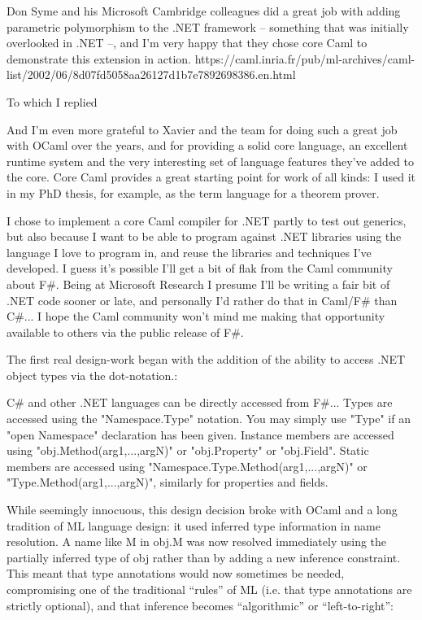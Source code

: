 \documentclass[acmsmall,screen]{acmart}
\begin{document}
\begin{verbquote}
Don Syme and his Microsoft Cambridge colleagues did a great job with adding parametric polymorphism to the .NET framework -- something that was initially overlooked in .NET --, and I'm very happy that they chose core Caml to demonstrate this extension in action. https://caml.inria.fr/pub/ml-archives/caml-list/2002/06/8d07fd5058aa26127d1b7e7892698386.en.html 
\end{verbquote}
To which I replied \citep{RefCamlArchive8}
\begin{verbquote}
And I'm even more grateful to Xavier and the team for doing such a great job with OCaml over the years, and for providing a solid core language, an excellent runtime system and the very interesting set of language features they've added to the core.  Core Caml provides a great starting point for work of all kinds: I used it in my PhD thesis, for example, as the term language for a theorem prover.

I chose to implement a core Caml compiler for .NET partly to test out generics, but also because I want to be able to program against .NET libraries using the language I love to program in, and reuse the libraries and techniques I've developed.  I guess it's possible I'll get a bit of flak from the Caml community about F#.  Being at Microsoft Research I presume I'll be writing a fair bit of .NET code sooner or late, and personally I'd rather do that in Caml/F# than C#... I hope the Caml community won't mind me making that opportunity available to others via the public release of F#.  
\end{verbquote}
The first real design-work began with the addition of the ability to access .NET object types via the dot-notation.:
\begin{verbquote}
C# and other .NET languages can be directly accessed from F#...  Types are accessed using the "Namespace.Type" notation.  You may simply use "Type" if an "open Namespace" declaration has been given. Instance members are accessed using "obj.Method(arg1,...,argN)" or "obj.Property" or "obj.Field". Static members are accessed using "Namespace.Type.Method(arg1,...,argN)" or "Type.Method(arg1,...,argN)", similarly for properties and fields. 
\end{verbquote}

While seemingly innocuous, this design decision broke with OCaml and a long tradition of ML language design: it used inferred type information in name resolution. A name like M in obj.M was now resolved immediately using the partially inferred type of obj rather than by adding a new inference constraint. This meant that type annotations would now sometimes be needed, compromising one of the traditional “rules” of ML (i.e. that type annotations are strictly optional), and that inference becomes “algorithmic” or “left-to-right”:
\end{document}
